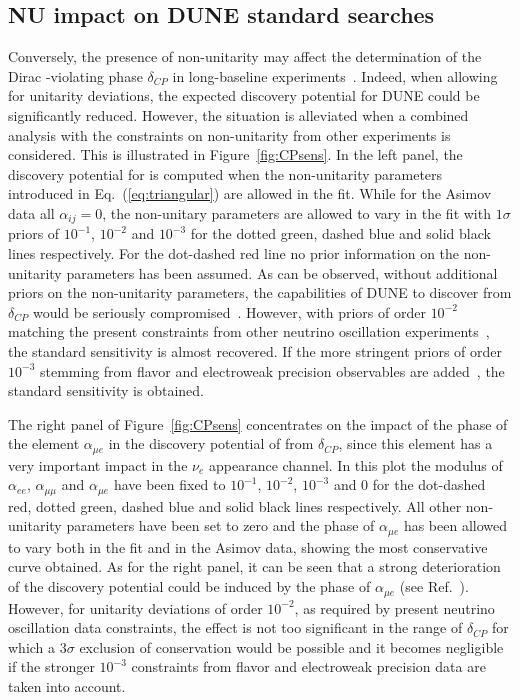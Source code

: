 \subsection{NU impact on DUNE standard searches}
Conversely, the presence of non-unitarity may affect the determination of the
Dirac -violating phase $\delta_{CP}$ in long-baseline experiments~\cite{Miranda:2016wdr,Fernandez-Martinez:2016lgt,Escrihuela:2016ube}.
 Indeed, when allowing for unitarity deviations, the expected  discovery potential for DUNE could be significantly reduced.
However, the situation is alleviated when a combined analysis with the constraints on non-unitarity from other experiments is considered. This is illustrated in Figure~\ref{fig:CPsens}. In the left panel, the discovery potential for  is computed when the non-unitarity parameters introduced in Eq.~(\ref{eq:triangular}) are allowed in the fit. While for the Asimov data all $\alpha_{ij}=0$, the non-unitary parameters are allowed to vary in the fit with $1 \sigma$ priors of $10^{-1}$, $10^{-2}$ and $10^{-3}$ for the dotted green, dashed blue and solid black lines respectively. For the dot-dashed red line no prior information on the non-unitarity parameters has been assumed. As can be observed, without additional priors on the non-unitarity parameters, the capabilities of DUNE to discover  from $\delta_{CP}$ would be seriously compromised~\cite{Escrihuela:2016ube}. However, with priors of order $10^{-2}$ matching the present constraints from other neutrino oscillation experiments~\cite{Escrihuela:2016ube,Blennow:2016jkn}, the standard sensitivity is almost recovered. If the more stringent priors of order $10^{-3}$ stemming from flavor and electroweak precision observables are added~\cite{Antusch:2014woa,Fernandez-Martinez:2016lgt}, the standard sensitivity is obtained.   

The right panel of Figure~\ref{fig:CPsens} concentrates on the impact of the phase of the element $\alpha_{\mu e}$ in the discovery potential of  from $\delta_{CP}$, since this element has a very important impact in the $\nu_e$ appearance channel. In this plot the modulus of $\alpha_{ee}$, $\alpha_{\mu \mu}$ and $\alpha_{\mu e}$ have been fixed to $10^{-1}$, $10^{-2}$, $10^{-3}$ and 0 for the dot-dashed red, dotted green, dashed blue and solid black lines respectively. All other non-unitarity parameters have been set to zero and the phase of $\alpha_{\mu e}$ has been allowed to vary both in the fit and in the Asimov data, showing the most conservative curve obtained. As for the right panel, it can be seen that a strong deterioration of the  discovery potential could be induced by the phase of $\alpha_{\mu e}$ (see Ref.~\cite{Escrihuela:2016ube}). However, for unitarity deviations of order $10^{-2}$, as required by present neutrino oscillation data constraints, the effect is not too significant in the range of $\delta_{CP}$ for which a $3 \sigma$ exclusion of  conservation would be possible and it becomes negligible if the stronger $10^{-3}$ constraints from flavor and electroweak precision data are taken into account.  

